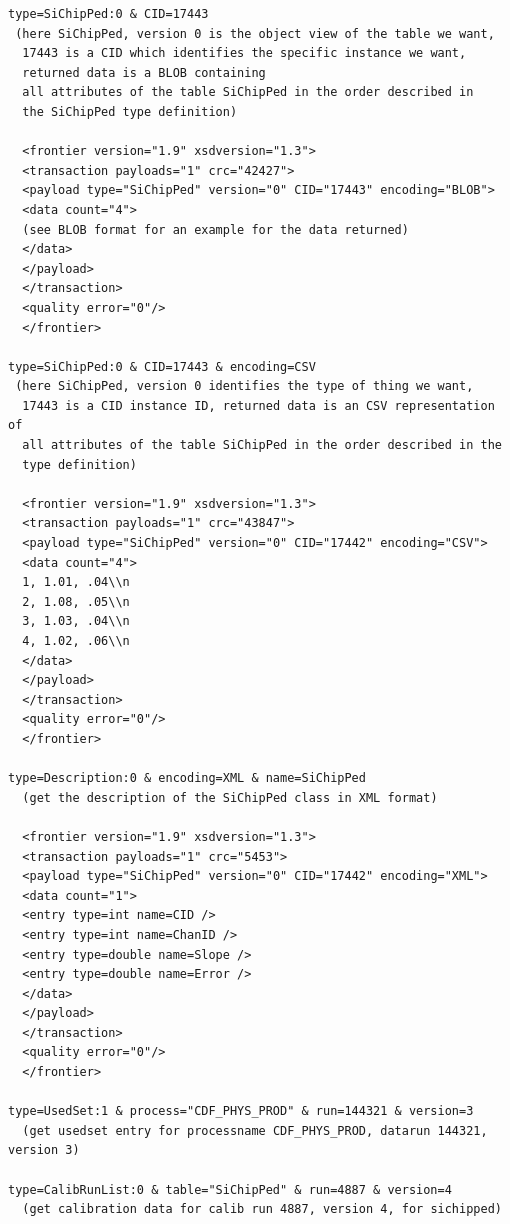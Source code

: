 \begin{verbatim}
type=SiChipPed:0 & CID=17443
 (here SiChipPed, version 0 is the object view of the table we want,
  17443 is a CID which identifies the specific instance we want,
  returned data is a BLOB containing
  all attributes of the table SiChipPed in the order described in 
  the SiChipPed type definition)

  <frontier version="1.9" xsdversion="1.3">
  <transaction payloads="1" crc="42427">
  <payload type="SiChipPed" version="0" CID="17443" encoding="BLOB">
  <data count="4">
  (see BLOB format for an example for the data returned)
  </data>	
  </payload>
  </transaction>
  <quality error="0"/>
  </frontier>

type=SiChipPed:0 & CID=17443 & encoding=CSV
 (here SiChipPed, version 0 identifies the type of thing we want,
  17443 is a CID instance ID, returned data is an CSV representation of
  all attributes of the table SiChipPed in the order described in the 
  type definition)

  <frontier version="1.9" xsdversion="1.3">
  <transaction payloads="1" crc="43847">
  <payload type="SiChipPed" version="0" CID="17442" encoding="CSV">
  <data count="4">
  1, 1.01, .04\\n
  2, 1.08, .05\\n
  3, 1.03, .04\\n
  4, 1.02, .06\\n
  </data>	
  </payload>
  </transaction>
  <quality error="0"/>
  </frontier>

type=Description:0 & encoding=XML & name=SiChipPed
  (get the description of the SiChipPed class in XML format)

  <frontier version="1.9" xsdversion="1.3">
  <transaction payloads="1" crc="5453">
  <payload type="SiChipPed" version="0" CID="17442" encoding="XML">
  <data count="1">
  <entry type=int name=CID />
  <entry type=int name=ChanID />
  <entry type=double name=Slope />
  <entry type=double name=Error />
  </data>	
  </payload>
  </transaction>
  <quality error="0"/>
  </frontier>

type=UsedSet:1 & process="CDF_PHYS_PROD" & run=144321 & version=3
  (get usedset entry for processname CDF_PHYS_PROD, datarun 144321, version 3)

type=CalibRunList:0 & table="SiChipPed" & run=4887 & version=4
  (get calibration data for calib run 4887, version 4, for sichipped)

\end{verbatim}

